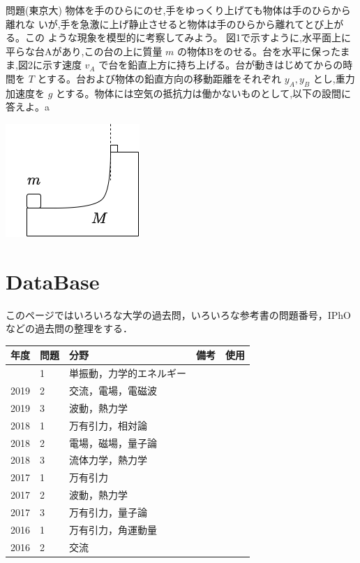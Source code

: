 \documentclass[
  b4paperpaper,
  xelatex,ja=standard]{bxjsbook}
\begin{document}
\begin{Qbox}{問題(東京大)}
物体を手のひらにのせ,手をゆっくり上げても物体は手のひらから離れな
いが,手を急激に上げ静止させると物体は手のひらから離れてとび上がる。この
ような現象を模型的に考察してみよう。
図1で示すように,水平面上に平らな台Aがあり,この台の上に質量 \(m\)
の物体Bをのせる。台を水平に保ったまま,図2に示す速度 \(v_A\)
で台を鉛直上方に持ち上げる。台が動きはじめてからの時間を \(T\)
とする。台および物体の鉛直方向の移動距離をそれぞれ \(y_A,y_B\)
とし,重力加速度を \(g\)
とする。物体には空気の抵抗力は働かないものとして,以下の設間に答えよ。a

\includegraphics{source/images/energy/energy1.png}

\end{Qbox}



\hypertarget{database}{%
\chapter*{DataBase}\label{database}}


このページではいろいろな大学の過去問，いろいろな参考書の問題番号，IPhOなどの過去問の整理をする．

\begin{longtable}[]{@{}lllll@{}}
\toprule\noalign{}
年度 & 問題 & 分野 & 備考 & 使用 \\
\midrule\noalign{}
\endhead
\bottomrule\noalign{}
\endlastfoot
2019 & 1 & 単振動，力学的エネルギー & & \\
2019 & 2 & 交流，電場，電磁波 & & \\
2019 & 3 & 波動，熱力学 & & \\
2018 & 1 & 万有引力，相対論 & & \\
2018 & 2 & 電場，磁場，量子論 & & \\
2018 & 3 & 流体力学，熱力学 & & \\
2017 & 1 & 万有引力 & & \\
2017 & 2 & 波動，熱力学 & & \\
2017 & 3 & 万有引力，量子論 & & \\
2016 & 1 & 万有引力，角運動量 & & \\
2016 & 2 & 交流 & & \\
\end{longtable}
\end{document}
